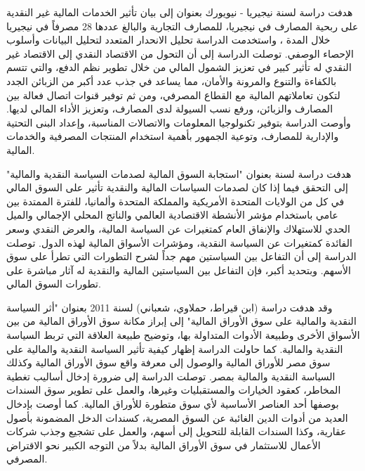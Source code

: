 \documentclass[10pt,a4paper]{report}
\begin{document}
\begin{doublespacing}
هدفت دراسة  لسنة  نيجيريا - نيويورك بعنوان  إلى بيان تأثير الخدمات المالية غير النقدية على ربحية المصارف في نيجيريا، للمصارف التجارية والبالغ عددها 28 مصرفاً في نيجيريا خلال المدة ، واستخدمت الدراسة تحليل الانحدار المتعدد لتحليل البيانات وأسلوب الإحصاء الوصفي. توصلت الدراسة إلى أن التحول من الاقتصاد النقدي إلى الاقتصاد غير النقدي له تأثير كبير في تعزيز الشمول المالي من خلال تطوير نظم الدفع، والتي تتسم بالكفاءة والتنوع والمرونة والأمان، مما يساعد في جذب عدد أكبر من الزبائن الجدد لتكون تعاملاتهم المالية مع القطاع المصرفي، ومن ثم توفير قنوات اتصال فعالة بين المصارف والزبائن، ورفع نسب السيولة لدى المصارف، وتعزيز الأداء المالي لديها. وأوصت الدراسة بتوفير تكنولوجيا المعلومات والاتصالات المناسبة، وإعداد البنى التحتية والإدارية للمصارف، وتوعية الجمهور بأهمية استخدام المنتجات المصرفية والخدمات المالية.

هدفت دراسة  لسنة  بعنوان "استجابة السوق المالية لصدمات السياسة النقدية والمالية" إلى التحقق فيما إذا كان لصدمات السياسات المالية والنقدية تأثير على السوق المالي في كل من الولايات المتحدة الأمريكية والمملكة المتحدة وألمانيا، للفترة الممتدة بين عامي  باستخدام مؤشر الأنشطة الاقتصادية العالمي والناتج المحلي الإجمالي والميل الحدي للاستهلاك والإنفاق العام كمتغيرات عن السياسة المالية، والعرض النقدي  وسعر الفائدة كمتغيرات عن السياسة النقدية، ومؤشرات الأسواق المالية لهذه الدول. توصلت الدراسة إلى أن التفاعل بين السياستين مهم جداً لشرح التطورات التي تطرأ على سوق الأسهم. وبتحديد أكبر، فإن التفاعل بين السياستين المالية والنقدية له آثار مباشرة على تطورات السوق المالي.

وقد هدفت دراسة (ابن قيراط، حملاوي، شعباني) لسنة 2011 بعنوان "أثر السياسة النقدية والمالية على سوق الأوراق المالية" إلى إبراز مكانة سوق الأوراق المالية من بين الأسواق الأخرى وطبيعة الأدوات المتداولة بها، وتوضيح طبيعة العلاقة التي تربط السياسة النقدية والمالية. كما حاولت الدراسة إظهار كيفية تأثير السياسة النقدية والمالية على سوق مصر للأوراق المالية والوصول إلى معرفة واقع سوق الأوراق المالية وكذلك السياسة النقدية والمالية بمصر. توصلت الدراسة إلى ضرورة إدخال أساليب تغطية المخاطر، كعقود الخيارات والمستقبليات وغيرها، والعمل على تطوير سوق السندات بوصفها أحد العناصر الأساسية لأي سوق متطورة للأوراق المالية. كما أوصت بإدخال العديد من أدوات الدين الغائبة عن السوق المصرية، كسندات الدخل المضمونة بأصول عقارية، وكذا السندات القابلة للتحويل إلى أسهم، والعمل على تشجيع وجذب شركات الأعمال للاستثمار في سوق الأوراق المالية بدلاً من التوجه الكبير نحو الاقتراض المصرفي.


\end{doublespacing}
\end{document}
